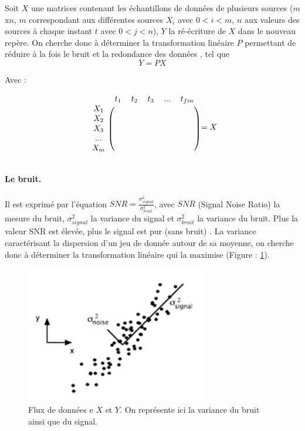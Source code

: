  Soit $X$ une matrices contenant les échantillons de données de plusieurs sources ($m$x$n$, $m$ correspondant aux différentes sources $X_i$ avec $0<i<m$, $n$ aux valeurs des sources à chaque instant $t$ avec $0<j<n$), $Y$ la ré-écriture de $X$ dans le nouveau repère. On cherche donc à déterminer la transformation linéaire $P$ permettant de réduire à la fois le bruit et la redondance des données  \cite{PCA}, tel que 
 \begin{equation}
 	 Y = PX
 \end{equation}

 Avec :
   
   \begin{equation}
   \begin{blockarray}{cccccc}
   & t_1 & t_2 & t_3 & ... & t_{fin} \\
   \begin{block}{c(ccccc)}
   X_1 &  &  &  &  &  &  \\
   X_2 &  &  &  &  &  &  \\
   X_3 &  &  &  &  &  &  \\
   ... &  &  &  &  &  &  \\
   X_m &  &  &  &  &  &  \\
   \end{block}
   \end{blockarray} = X
    \end{equation}
 
\paragraph{Le bruit.} Il est exprimé par l'équation $SNR = \frac{\sigma^2_{signal}}{\sigma^2_{bruit}}$, avec $SNR$ (Signal Noise Ratio) la mesure du bruit, $\sigma^2_{signal}$ la variance du signal et $\sigma^2_{bruit}$ la variance du bruit. Plus la valeur SNR est élevée, plus le signal est pur (sans bruit)  \cite{PCA}  \cite{PCA2}. La variance caractérisant la dispersion d'un jeu de donnée autour de sa moyenne, on cherche donc à déterminer la transformation linéaire qui la maximise (Figure : \ref{bruit_PCA}).

\begin{figure}[h]
	\centering\includegraphics[width=8cm]{images/PCA_donnees.png}
	\caption[Bruit du flux de donnée $X$ et $Y$.]{Flux de données e $X$ et $Y$. On représente ici la variance du bruit ainsi que du signal. \cite{PCA}}
	\label{bruit_PCA}
\end{figure}

